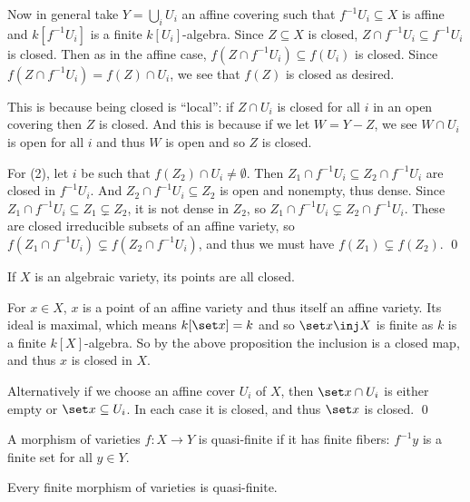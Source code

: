    Now in general take $Y=\bigcup_iU_i$ an affine covering such that $f^{-1}U_i\subseteq X$ is affine and $k[f^{-1}U_i]$ is a finite $k[U_i]$-algebra.
    Since $Z\subseteq X$ is closed, $Z\cap f^{-1}U_i\subseteq f^{-1}U_i$ is closed.
    Then as in the affine case, $f(Z\cap f^{-1}U_i)\subseteq f(U_i)$ is closed.
    Since $f(Z\cap f^{-1}U_i)=f(Z)\cap U_i$, we see that $f(Z)$ is closed as desired.

    This is because being closed is ``local'': if $Z\cap U_i$ is closed for all $i$ in an open covering then $Z$ is closed.
    And this is because if we let $W=Y-Z$, we see $W\cap U_i$ is open for all $i$ and thus $W$ is open and so $Z$ is closed.

    For (2), let $i$ be such that $f(Z_2)\cap U_i\neq\emptyset$.
    Then $Z_1\cap f^{-1}U_i\subseteq Z_2\cap f^{-1}U_i$ are closed in $f^{-1}U_i$.
    And $Z_2\cap f^{-1}U_i\subseteq Z_2$ is open and nonempty, thus dense.
    Since $Z_1\cap f^{-1}U_i\subseteq Z_1\subsetneq Z_2$, it is not dense in $Z_2$, so $Z_1\cap f^{-1}U_i\subsetneq Z_2\cap f^{-1}U_i$.
    These are closed irreducible subsets of an affine variety, so $f(Z_1\cap f^{-1}U_i)\subsetneq f(Z_2\cap f^{-1}U_i)$,
    and thus we must have $f(Z_1)\subsetneq f(Z_2)$.
    \qed

\eproof

\bcoro

    If $X$ is an algebraic variety, its points are all closed.

\ecoro

\bproof

    For $x\in X$, $x$ is a point of an affine variety and thus itself an affine variety.
    Its ideal is maximal, which means $k[\set x]=k$ and so $\set x\inj X$ is finite as $k$ is a finite $k[X]$-algebra.
    So by the above proposition the inclusion is a closed map, and thus $x$ is closed in $X$.

    Alternatively if we choose an affine cover $U_i$ of $X$, then $\set x\cap U_i$ is either empty or $\set x\subseteq U_i$.
    In each case it is closed, and thus $\set x$ is closed.
    \qed

\eproof

\bdefn

    A morphism of varieties $f\colon X\to Y$ is {\emphcolor quasi-finite} if it has finite fibers: $f^{-1}y$ is a finite set for all $y\in Y$.

\edefn

\bcoro

    Every finite morphism of varieties is quasi-finite.


